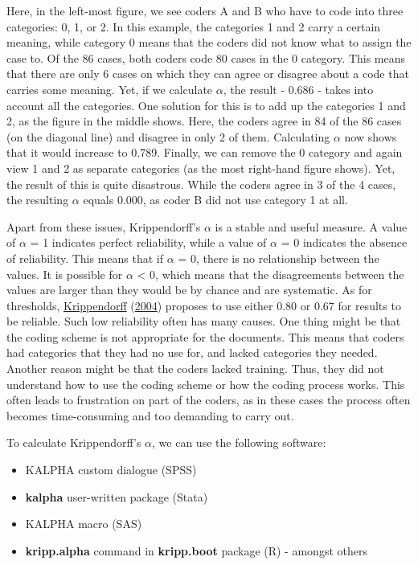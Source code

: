 \documentclass[
]{book}
\providecommand{\tightlist}{%
  \setlength{\itemsep}{0pt}\setlength{\parskip}{0pt}}
\begin{document}
Here, in the left-most figure, we see coders A and B who have to code into three categories: 0, 1, or 2. In this example, the categories 1 and 2 carry a certain meaning, while category 0 means that the coders did not know what to assign the case to. Of the 86 cases, both coders code 80 cases in the 0 category. This means that there are only 6 cases on which they can agree or disagree about a code that carries some meaning. Yet, if we calculate \(\alpha\), the result - 0.686 - takes into account all the categories. One solution for this is to add up the categories 1 and 2, as the figure in the middle shows. Here, the coders agree in 84 of the 86 cases (on the diagonal line) and disagree in only 2 of them. Calculating \(\alpha\) now shows that it would increase to 0.789. Finally, we can remove the 0 category and again view 1 and 2 as separate categories (as the most right-hand figure shows). Yet, the result of this is quite disastrous. While the coders agree in 3 of the 4 cases, the resulting \(\alpha\) equals 0.000, as coder B did not use category 1 at all.

Apart from these issues, Krippendorff's \(\alpha\) is a stable and useful measure. A value of \(\alpha\) = 1 indicates perfect reliability, while a value of \(\alpha\) = 0 indicates the absence of reliability. This means that if \(\alpha\) = 0, there is no relationship between the values. It is possible for \(\alpha\) \textless{} 0, which means that the disagreements between the values are larger than they would be by chance and are systematic. As for thresholds, \protect\hyperlink{ref-Krippendorff2004a}{Krippendorff} (\protect\hyperlink{ref-Krippendorff2004a}{2004}) proposes to use either 0.80 or 0.67 for results to be reliable. Such low reliability often has many causes. One thing might be that the coding scheme is not appropriate for the documents. This means that coders had categories that they had no use for, and lacked categories they needed. Another reason might be that the coders lacked training. Thus, they did not understand how to use the coding scheme or how the coding process works. This often leads to frustration on part of the coders, as in these cases the process often becomes time-consuming and too demanding to carry out.

To calculate Krippendorff's \(\alpha\), we can use the following software:

\begin{itemize}
\tightlist
\item
  KALPHA custom dialogue (SPSS)
\item
  \textbf{kalpha} user-written package (Stata)
\item
  KALPHA macro (SAS)
\item
  \textbf{kripp.alpha} command in \textbf{kripp.boot} package (R) - amongst others
\end{itemize}
\end{document}
